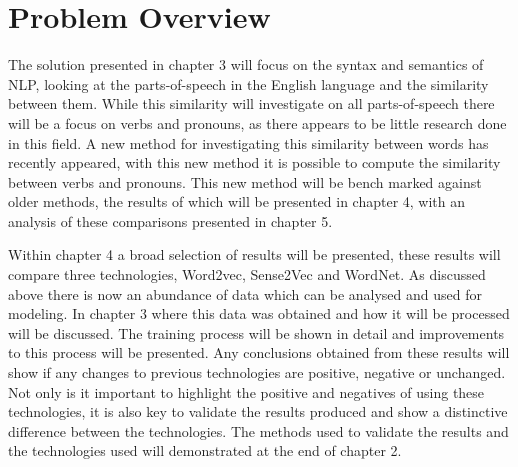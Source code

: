 \section{Problem Overview}
The solution presented in chapter 3 will focus on the syntax and semantics of NLP, looking at the parts-of-speech in the English language and the similarity between them. While this similarity will investigate on all parts-of-speech there will be a focus on verbs and pronouns, as there appears to be little research done in this field. A new method for investigating this similarity between words has recently appeared, with this new method it is possible to compute the similarity between verbs and pronouns. This new method will be bench marked against older methods, the results of which will be presented in chapter 4, with an analysis of these comparisons presented in chapter 5.

Within chapter 4 a broad selection of results will be presented, these results will compare three technologies, Word2vec, Sense2Vec and WordNet. As discussed above there is now an abundance of data which can be analysed and used for modeling. In chapter 3 where this data was obtained and how it will be processed will be discussed. The training process will be shown in detail and improvements to this process will be presented. Any conclusions obtained from these results will show if any changes to previous technologies are positive, negative or unchanged. Not only is it important to highlight the positive and negatives of using these technologies, it is also key to validate the results produced and show a distinctive difference between the technologies. The methods used to validate the results and the technologies used will demonstrated at the end of chapter 2.